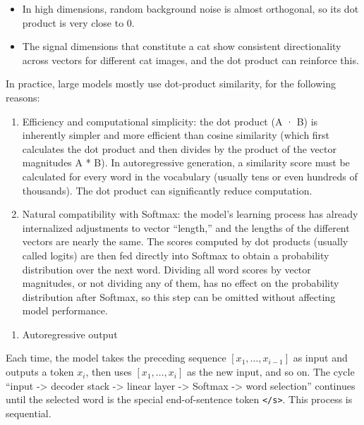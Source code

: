 \begin{itemize}
\tightlist
\item
  In high dimensions, random background noise is almost orthogonal, so its dot product is very close to 0.
\item
  The signal dimensions that constitute a cat show consistent directionality across vectors for different cat images, and the dot product can reinforce this.
\end{itemize}

In practice, large models mostly use dot-product similarity, for the following reasons:

\begin{enumerate}
\def\labelenumi{(\arabic{enumi})}
\item
  Efficiency and computational simplicity: the dot product (A · B) is inherently simpler and more efficient than cosine similarity (which first calculates the dot product and then divides by the product of the vector magnitudes \textbar\textbar A\textbar\textbar{} * \textbar\textbar B\textbar\textbar). In autoregressive generation, a similarity score must be calculated for every word in the vocabulary (usually tens or even hundreds of thousands). The dot product can significantly reduce computation.
\item
  Natural compatibility with Softmax: the model's learning process has already internalized adjustments to vector ``length,'' and the lengths of the different vectors are nearly the same. The scores computed by dot products (usually called logits) are then fed directly into Softmax to obtain a probability distribution over the next word. Dividing all word scores by vector magnitudes, or not dividing any of them, has no effect on the probability distribution after Softmax, so this step can be omitted without affecting model performance.
\end{enumerate}

\begin{enumerate}
\def\labelenumi{\arabic{enumi}.}
\setcounter{enumi}{2}
\tightlist
\item
  Autoregressive output
\end{enumerate}

Each time, the model takes the preceding sequence \([x_1,\ldots,x_{i-1}]\) as input and outputs a token \(x_i\), then uses \([x_1,\ldots,x_i]\) as the new input, and so on. The cycle ``input -\textgreater{} decoder stack -\textgreater{} linear layer -\textgreater{} Softmax -\textgreater{} word selection'' continues until the selected word is the special end-of-sentence token \texttt{\textless{}/s\textgreater{}}. This process is sequential.

